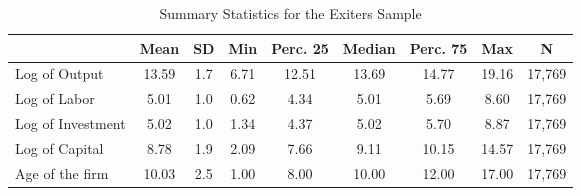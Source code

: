 \begin{table}[htbp]\centering
\def\sym#1{\ifmmode^{#1}\else\(^{#1}\)\fi}
\caption{Summary Statistics for the Exiters Sample \label{tab:exitstats}}
\begin{tabular}{l*{1}{cccccccc}}
\toprule
                    &        Mean&          SD&         Min&    Perc. 25&      Median&    Perc. 75&         Max&           N\\
\midrule
Log of Output       &       13.59&         1.7&        6.71&       12.51&       13.69&       14.77&       19.16&      17,769\\
Log of Labor        &        5.01&         1.0&        0.62&        4.34&        5.01&        5.69&        8.60&      17,769\\
Log of Investment   &        5.02&         1.0&        1.34&        4.37&        5.02&        5.70&        8.87&      17,769\\
Log of Capital      &        8.78&         1.9&        2.09&        7.66&        9.11&       10.15&       14.57&      17,769\\
Age of the firm     &       10.03&         2.5&        1.00&        8.00&       10.00&       12.00&       17.00&      17,769\\
\bottomrule
\end{tabular}
\end{table}
